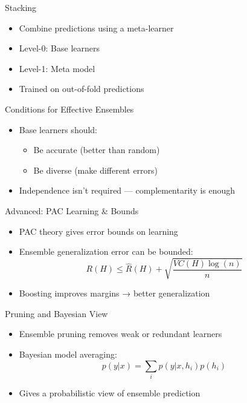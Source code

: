 \documentclass{beamer}
\begin{document}
\begin{frame}{Stacking}
\begin{itemize}
    \item Combine predictions using a meta-learner
    \item Level-0: Base learners
    \item Level-1: Meta model
    \item Trained on out-of-fold predictions
\end{itemize}
\end{frame}

\begin{frame}{Conditions for Effective Ensembles}
\begin{itemize}
    \item Base learners should:
    \begin{itemize}
        \item Be accurate (better than random)
        \item Be diverse (make different errors)
    \end{itemize}
    \item Independence isn't required — complementarity is enough
\end{itemize}
\end{frame}

\begin{frame}{Advanced: PAC Learning & Bounds}
\begin{itemize}
    \item PAC theory gives error bounds on learning
    \item Ensemble generalization error can be bounded:
    \[
    R(H) \leq \hat{R}(H) + \sqrt{\frac{VC(H) \log(n)}{n}}
    \]
    \item Boosting improves margins → better generalization
\end{itemize}
\end{frame}

\begin{frame}{Pruning and Bayesian View}
\begin{itemize}
    \item Ensemble pruning removes weak or redundant learners
    \item Bayesian model averaging:
    \[
    p(y|x) = \sum_{i} p(y|x, h_i) p(h_i)
    \]
    \item Gives a probabilistic view of ensemble prediction
\end{itemize}
\end{frame}
\end{document}
